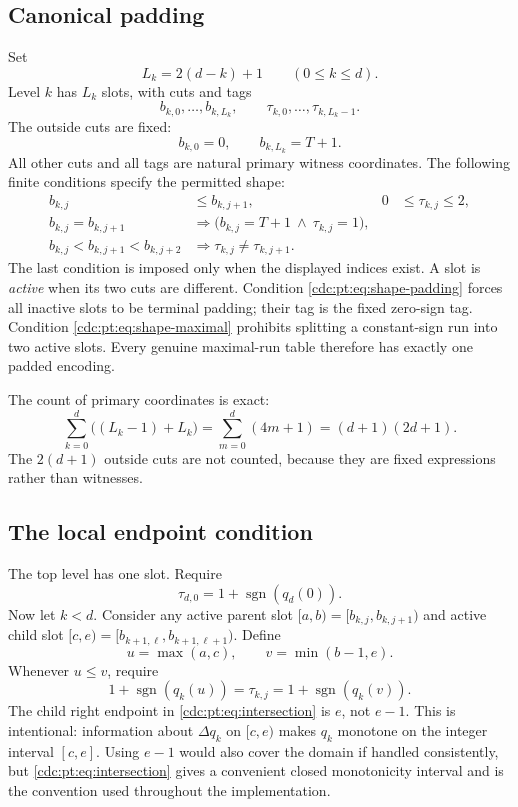 \documentclass[11pt,a4paper]{article}
\theoremstyle{definition}
\theoremstyle{remark}
\newcommand{\sgn}{\operatorname{sgn}}
\begin{document}
\subsection{Canonical padding}
Set
\[
 L_k=2(d-k)+1\qquad(0\leq k\leq d).
\]
Level $k$ has $L_k$ slots, with cuts and tags
\[
 b_{k,0},\ldots,b_{k,L_k},\qquad
 \tau_{k,0},\ldots,\tau_{k,L_k-1}.
\]
The outside cuts are fixed:
\[
 b_{k,0}=0,\qquad b_{k,L_k}=T+1.
\]
All other cuts and all tags are natural primary witness coordinates. The
following finite conditions specify the permitted shape:
\begin{align}
 b_{k,j}&\leq b_{k,j+1},& 0&\leq\tau_{k,j}\leq2,
 \label{cdc:pt:eq:shape-order}\\
 b_{k,j}=b_{k,j+1}&\Longrightarrow
 \bigl(b_{k,j}=T+1\ \wedge\ \tau_{k,j}=1\bigr),
 \label{cdc:pt:eq:shape-padding}\\
 b_{k,j}<b_{k,j+1}<b_{k,j+2}&\Longrightarrow
 \tau_{k,j}\neq\tau_{k,j+1}.
 \label{cdc:pt:eq:shape-maximal}
\end{align}
The last condition is imposed only when the displayed indices exist.
A slot is \emph{active} when its two cuts are different. Condition
\eqref{cdc:pt:eq:shape-padding} forces all inactive slots to be terminal padding;
their tag is the fixed zero-sign tag. Condition
\eqref{cdc:pt:eq:shape-maximal} prohibits splitting a constant-sign run into two
active slots. Every genuine maximal-run table therefore has exactly one
padded encoding.

The count of primary coordinates is exact:
\begin{equation}
 \sum_{k=0}^d\bigl((L_k-1)+L_k\bigr)
 =\sum_{m=0}^d(4m+1)
 =(d+1)(2d+1).
 \label{cdc:pt:eq:primary-count}
\end{equation}
The $2(d+1)$ outside cuts are not counted, because they are fixed
expressions rather than witnesses.

\subsection{The local endpoint condition}
The top level has one slot. Require
\begin{equation}
 \tau_{d,0}=1+\sgn(q_d(0)).
 \label{cdc:pt:eq:top-level}
\end{equation}
Now let $k<d$. Consider any active parent slot
$[a,b)=[b_{k,j},b_{k,j+1})$ and active child slot
$[c,e)=[b_{k+1,\ell},b_{k+1,\ell+1})$. Define
\begin{equation}
 u=\max(a,c),\qquad v=\min(b-1,e).
 \label{cdc:pt:eq:intersection}
\end{equation}
Whenever $u\leq v$, require
\begin{equation}
 1+\sgn(q_k(u))=\tau_{k,j}
 =1+\sgn(q_k(v)).
 \label{cdc:pt:eq:endpoint-condition}
\end{equation}
The child right endpoint in \eqref{cdc:pt:eq:intersection} is $e$, not $e-1$.
This is intentional: information about $\Delta q_k$ on $[c,e)$ makes
$q_k$ monotone on the integer interval $[c,e]$. Using $e-1$ would also
cover the domain if handled consistently, but \eqref{cdc:pt:eq:intersection}
gives a convenient closed monotonicity interval and is the convention used
throughout the implementation.
\end{document}
